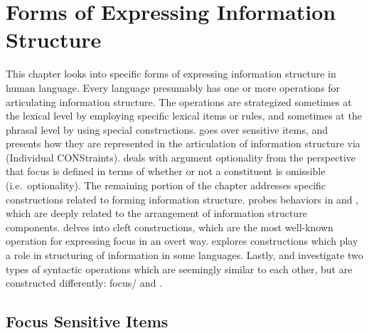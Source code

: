 \chapter{Forms of Expressing Information Structure}
\label{chapter10-3}
\setcounter{enums}{0}

This chapter looks into specific forms of expressing information
structure in human language. Every language presumably has one or more
operations for articulating information structure. The operations are
strategized sometimes at the lexical level by employing specific
lexical items or rules, and sometimes at the phrasal level by using
special constructions.   goes over 
sensitive items, and presents how they are represented in the
articulation of information structure via  (Individual
CONStraints).
 deals with argument optionality from the
perspective that focus is defined in terms of whether or not a
constituent is omissible (i.e.\ optionality).
The remaining portion of the chapter addresses 
specific constructions related to forming information
structure. 
probes  behaviors in
 and , which are deeply related to the
arrangement of information structure components. 
delves into cleft constructions, which are the most
well-known operation for expressing focus in an overt way.
 explores  constructions which play a
role in structuring of information in some languages.  Lastly,
 and  investigate two
types of syntactic operations which are seemingly similar to each
other, but are constructed differently: focus/  and
.



\section{Focus Sensitive Items}
\label{10:ssec:focus-sensitive}

